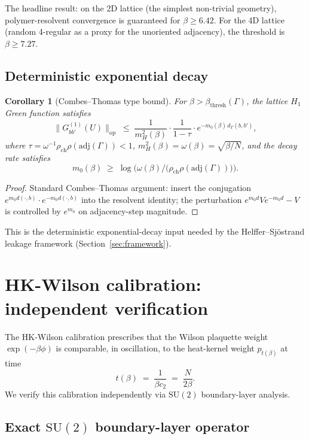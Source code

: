 \documentclass[11pt,a4paper]{article}
\newtheorem{corollary}[theorem]{Corollary}
\theoremstyle{definition}
\newcommand{\SU}{\mathrm{SU}}
\begin{document}
The headline result: on the 2D lattice (the simplest non-trivial
geometry), polymer-resolvent convergence is guaranteed for
$\beta \ge 6.42$. For the 4D lattice (random 4-regular as a
proxy for the unoriented adjacency), the threshold is $\beta \ge 7.27$.

\subsection{Deterministic exponential decay}

\begin{corollary}[Combes--Thomas type bound]\label{cor:CT}
For $\beta > \beta_{\mathrm{thresh}}(\Gamma)$, the lattice $H_1$ Green
function satisfies
\[
\|G^{(1)}_{bb'}(U)\|_{\mathrm{op}}
\;\le\;
\frac{1}{m_H^2(\beta)}\cdot\frac{1}{1-\tau}\cdot
e^{-m_0(\beta)\,d_\Gamma(b,b')},
\]
where $\tau = \omega^{-1}\rho_{\mathrm{ch}}\rho(\mathrm{adj}(\Gamma))
< 1$, $m_H^2(\beta) = \omega(\beta) = \sqrt{\beta/N}$, and the decay
rate satisfies
\[
m_0(\beta) \;\ge\; \log\Big(\omega(\beta)/
\big(\rho_{\mathrm{ch}}\rho(\mathrm{adj}(\Gamma))\big)\Big).
\]
\end{corollary}

\begin{proof}
Standard Combes--Thomas argument: insert the conjugation
$e^{m_0 d(\cdot,b)}\cdot e^{-m_0 d(\cdot,b)}$ into the resolvent
identity; the perturbation $e^{m_0 d}V e^{-m_0 d} - V$ is
controlled by $e^{m_0}$ on adjacency-step magnitude.
\end{proof}

This is the deterministic exponential-decay input needed by the
Helffer--Sj\"ostrand leakage framework (Section~\ref{sec:framework}).

\section{HK-Wilson calibration: independent verification}\label{sec:hk-cal}

The HK-Wilson calibration prescribes that the Wilson plaquette weight
$\exp(-\beta\phi)$ is comparable, in oscillation, to the heat-kernel
weight $p_{t(\beta)}$ at time
\[
t(\beta) \;=\; \frac{1}{\beta c_2} \;=\; \frac{N}{2\beta}.
\]
We verify this calibration independently via $\SU(2)$ boundary-layer
analysis.

\subsection{Exact $\SU(2)$ boundary-layer operator}
\end{document}
